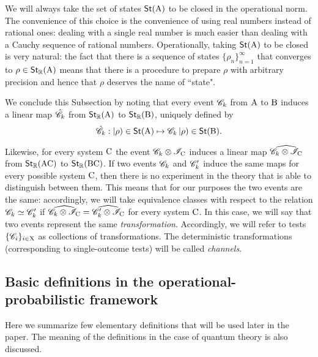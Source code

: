 \documentclass[12pt,aps,pra,showpacs,groupedaddress]{revtex4-1}
\def\rB{{\rm B}}
\def\rC{{\rm C}}
\def\Stset{{\mathsf{St}}}
\def\K#1{\left|#1\right)}  \def\B#1{\left(#1\right|}
\def\Reals{{\mathbb R}}
\begin{document}
We will always take the set of states $\Stset(\rA)$ to be closed in
the operational norm. The convenience of this choice is the convenience of using real numbers
instead of rational ones: dealing with a single real number is much easier than dealing with
a Cauchy sequence of rational numbers. %
Operationally, taking $\Stset(\rA)$ to be closed is very natural: the fact that there is a sequence of states $\{\rho_n\}_{n=1}^\infty$
that converges to $\rho\in\Stset_\Reals (\rA)$ means that there is a procedure to prepare $\rho$
with arbitrary precision and hence that $\rho$ deserves the name of ``state".
    


We conclude this Subsection by noting that every event $\mathscr C_k$ from ${\rm A}$ to
$\rB$ induces a linear map $\hat {\mathscr C_k}$ from $\Stset_\Reals (\rA)$ to
$\Stset_\Reals (\rB)$, uniquely defined by  
\begin{equation*}
\hat{\tC_k}: \K{\rho} \in \Stset (\rA)
\mapsto \tC_k \K{ \rho} \in \Stset (\rB).
\end{equation*}


Likewise, for every system $\rC$ the event $\tC_k \otimes \tI_\rC$ induces a linear map
$\widehat{\tC_k \otimes \tI_\rC }$ from $\Stset_\Reals (\rA\rC)$ to $\Stset_\Reals (\rB\rC)$. If two
events $\mathscr C_k$ and $\mathscr C_k'$ induce the same maps for every possible system $\rC$, then there is no
experiment in the theory that is able to distinguish between them.  This means that for our purposes the two
events are the same: accordingly, we will take equivalence classes with respect to the relation
$\mathscr C_k \simeq \mathscr C_k'$ if $\widehat { \tC_k \otimes \tI_\rC} = \widehat{ \tC_k' \otimes \tI_\rC}$ for
every system $\rC$.  In this case, we will say that two events represent the same
\emph{transformation}. Accordingly, we will refer to tests $\{\mathscr C_i\}_{i \in{\rm X}}$ as collections of
transformations.  The deterministic transformations (corresponding to single-outcome tests) will be
called \emph{channels}.



\subsection{Basic definitions in the operational-probabilistic framework }  
Here we summarize few elementary definitions that will be used later in the paper. The meaning of
the definitions in the case of quantum theory is also discussed.
\end{document}
